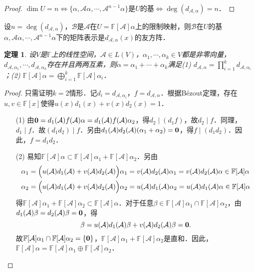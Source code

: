 \documentclass[a4paper,fontset=windows]{ctexbook}
\newtheorem{theorem}{定理}[chapter]
\theoremstyle{definition}
\begin{document}
\begin{proof}
$\dim U=n\Leftrightarrow\{\alpha,\mathcal{A}\alpha,\cdots,\mathcal{A}^{n-1}\alpha\}$是$U$的基$\Leftrightarrow\deg(d_{\mathcal{A},\alpha})=n$．
\end{proof}

设$n=\deg(d_{\mathcal{A},\alpha})$，$\mathcal{B}$是$\mathcal{A}$在$U=\mathbb{F}[\mathcal{A}]\alpha$上的限制映射，则$\mathcal{B}$在$U$的基$\alpha,\mathcal{A}\alpha,\cdots,\mathcal{A}^{n-1}\alpha$下的矩阵表示是$d_{\mathcal{A},\alpha}(x)$的友方阵．

\begin{theorem}\label{thm9.17}
设$V$是$\mathbb{F}$上的线性空间，$\mathcal{A}\in L(V)$，$\alpha_1,\cdots,\alpha_k\in V$都是非零向量，$d_{\mathcal{A},\alpha_1},\cdots,d_{\mathcal{A},\alpha_k}$存在并且两两互素，则$\alpha=\alpha_1+\cdots+\alpha_k$满足(1) $d_{\mathcal{A},\alpha}=\prod\limits_{i=1}^kd_{\mathcal{A},\alpha_i}$；(2) $\mathbb{F}[\mathcal{A}]\alpha=\bigoplus\limits_{i=1}^k\mathbb{F}[\mathcal{A}]\alpha_i$．
\end{theorem}

\begin{proof}
只需证明$k=2$情形．记$d_i=d_{\mathcal{A},\alpha_i}$，$f=d_{\mathcal{A},\alpha}$．根据B\'ezout定理，存在$u,v\in\mathbb{F}[x]$使得$u(x)d_1(x)+v(x)d_2(x)=1$．
\begin{itemize}
\item[(1)] 由${\bf 0}=d_1(\mathcal{A})f(\mathcal{A})\alpha=d_1(\mathcal{A})f(\mathcal{A})\alpha_2$，得$d_2\mid(d_1f)$，故$d_2\mid f$．同理，$d_1\mid f$．故$(d_1d_2)\mid f$．另由$d_1(\mathcal{A})d_2(\mathcal{A})(\alpha_1+\alpha_2)={\bf 0}$，得$f\mid(d_1d_2)$．因此，$f=d_1d_2$．
\item[(2)] 易知$\mathbb{F}[\mathcal{A}]\alpha\subset\mathbb{F}[\mathcal{A}]\alpha_1+\mathbb{F}[\mathcal{A}]\alpha_2$．另由
\begin{align*}
\alpha_1&=\Bigl(u(\mathcal{A})d_1(\mathcal{A})+v(\mathcal{A})d_2(\mathcal{A})\Bigr)\alpha_1=v(\mathcal{A})d_2(\mathcal{A})\alpha_1=v(\mathcal{A})d_2(\mathcal{A})\alpha\in\mathbb{F}[\mathcal{A}]\alpha \\
\alpha_2&=\Bigl(u(\mathcal{A})d_1(\mathcal{A})+v(\mathcal{A})d_2(\mathcal{A})\Bigr)\alpha_2=u(\mathcal{A})d_1(\mathcal{A})\alpha_2=u(\mathcal{A})d_1(\mathcal{A})\alpha\in\mathbb{F}[\mathcal{A}]\alpha
\end{align*}
得$\mathbb{F}[\mathcal{A}]\alpha_1+\mathbb{F}[\mathcal{A}]\alpha_2\subset\mathbb{F}[\mathcal{A}]\alpha$．对于任意$\beta\in\mathbb{F}[\mathcal{A}]\alpha_1\cap\mathbb{F}[\mathcal{A}]\alpha_2$，由$d_1(\mathcal{A})\beta=d_2(\mathcal{A})\beta={\bf 0}$，得
$$\beta=u(\mathcal{A})d_1(\mathcal{A})\beta+v(\mathcal{A})d_2(\mathcal{A})\beta={\bf 0}.$$
故$\mathbb{F}[\mathcal{A}]\alpha_1\cap\mathbb{F}[\mathcal{A}]\alpha_2=\{\bf 0\}$，$\mathbb{F}[\mathcal{A}]\alpha_1+\mathbb{F}[\mathcal{A}]\alpha_2$是直和．因此，$\mathbb{F}[\mathcal{A}]\alpha=\mathbb{F}[\mathcal{A}]\alpha_1\oplus\mathbb{F}[\mathcal{A}]\alpha_2$．\qedhere
\end{itemize}
\end{proof}
\end{document}
